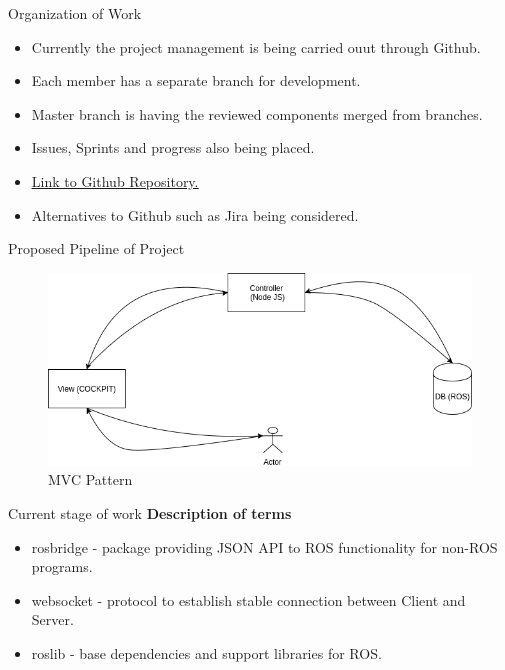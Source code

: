 \documentclass[aspectratio=169]{beamer}
\begin{document}
\begin{frame}{Organization of Work}
\vspace*{-15mm}
\linespread{2}
	\begin{itemize}
	\item Currently the project management is being carried ouut through Github.
	\item Each member has a separate branch for development.
	\item Master branch is having the reviewed components merged from branches.
	\item Issues, Sprints and progress also being placed.
	\item  \href{https://github.com/lokeshveeramacheneni/Software-Development-Project/tree/master}{\underline{Link to Github Repository.}} 
	\item Alternatives to Github such as Jira being considered.
	\end{itemize}
	
\end{frame}
\begin{frame}{Proposed Pipeline of Project}
\begin{figure}
  \includegraphics[width=0.8\linewidth]{pipeline.png}
  \caption{MVC Pattern}
  \label{fig: MVC Pattern}
\end{figure}
\end{frame}
\begin{frame}{Current stage of work}
\vspace*{-15mm}
\linespread{1.5}
	\textbf{Description of terms}
	\begin{itemize}
\item rosbridge - package providing JSON API to ROS functionality for non-ROS programs.
\item websocket - protocol to establish stable connection between Client and Server.
\item roslib - base dependencies and support libraries for ROS.
	\end{itemize}
\end{frame}
\end{document}
